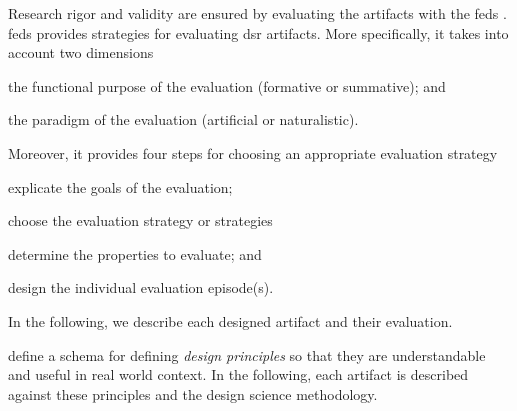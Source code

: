 Research rigor and validity are ensured by evaluating the artifacts with the \gls{feds} \citep{Venable2016}. \Gls{feds} provides strategies for evaluating \gls{dsr} artifacts. More specifically, it takes into account two dimensions
\begin{inparaenum}[\itshape i)]
	\item the functional purpose of the
	evaluation (formative or summative); and 
	\item the paradigm of the evaluation (artificial or naturalistic).
\end{inparaenum} 
Moreover, it provides four steps for choosing an appropriate evaluation strategy
\begin{inparaenum}[\itshape i)]
	\item explicate the goals of the evaluation;
	\item choose the evaluation strategy or strategies
	\item determine the properties to evaluate; and
	\item design the individual evaluation episode(s). 
\end{inparaenum} In the following, we describe each designed artifact and their evaluation. 



\cite{Gregor2020} define a schema for defining \emph{design principles} so that they are understandable and useful in real world context.  In the following, each artifact is described against these principles and the design science methodology. 


%


